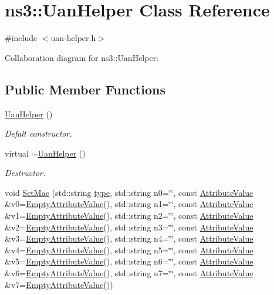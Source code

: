 \hypertarget{classns3_1_1UanHelper}{}\section{ns3\+:\+:Uan\+Helper Class Reference}
\label{classns3_1_1UanHelper}


{\ttfamily \#include $<$uan-\/helper.\+h$>$}



Collaboration diagram for ns3\+:\+:Uan\+Helper\+:
\subsection*{Public Member Functions}
\begin{DoxyCompactItemize}
\item 
\hyperlink{classns3_1_1UanHelper_ac88fdb3d1d21f26f79790f3e53e81320}{Uan\+Helper} ()
\begin{DoxyCompactList}\small\item\em Defalt constructor. \end{DoxyCompactList}\item 
virtual \hyperlink{classns3_1_1UanHelper_acd52ced33d1b5211052ba87a7f4ccba6}{$\sim$\+Uan\+Helper} ()
\begin{DoxyCompactList}\small\item\em Destructor. \end{DoxyCompactList}\item 
void \hyperlink{classns3_1_1UanHelper_a1c99a2afa329597107452c42eb9c43b9}{Set\+Mac} (std\+::string \hyperlink{visualizer-ideas_8txt_add98db9e15e2a58cf2b57623e7aa893a}{type}, std\+::string n0=\char`\"{}\char`\"{}, const \hyperlink{classns3_1_1AttributeValue}{Attribute\+Value} \&v0=\hyperlink{classns3_1_1EmptyAttributeValue}{Empty\+Attribute\+Value}(), std\+::string n1=\char`\"{}\char`\"{}, const \hyperlink{classns3_1_1AttributeValue}{Attribute\+Value} \&v1=\hyperlink{classns3_1_1EmptyAttributeValue}{Empty\+Attribute\+Value}(), std\+::string n2=\char`\"{}\char`\"{}, const \hyperlink{classns3_1_1AttributeValue}{Attribute\+Value} \&v2=\hyperlink{classns3_1_1EmptyAttributeValue}{Empty\+Attribute\+Value}(), std\+::string n3=\char`\"{}\char`\"{}, const \hyperlink{classns3_1_1AttributeValue}{Attribute\+Value} \&v3=\hyperlink{classns3_1_1EmptyAttributeValue}{Empty\+Attribute\+Value}(), std\+::string n4=\char`\"{}\char`\"{}, const \hyperlink{classns3_1_1AttributeValue}{Attribute\+Value} \&v4=\hyperlink{classns3_1_1EmptyAttributeValue}{Empty\+Attribute\+Value}(), std\+::string n5=\char`\"{}\char`\"{}, const \hyperlink{classns3_1_1AttributeValue}{Attribute\+Value} \&v5=\hyperlink{classns3_1_1EmptyAttributeValue}{Empty\+Attribute\+Value}(), std\+::string n6=\char`\"{}\char`\"{}, const \hyperlink{classns3_1_1AttributeValue}{Attribute\+Value} \&v6=\hyperlink{classns3_1_1EmptyAttributeValue}{Empty\+Attribute\+Value}(), std\+::string n7=\char`\"{}\char`\"{}, const \hyperlink{classns3_1_1AttributeValue}{Attribute\+Value} \&v7=\hyperlink{classns3_1_1EmptyAttributeValue}{Empty\+Attribute\+Value}())

\end{DoxyCompactItemize}
